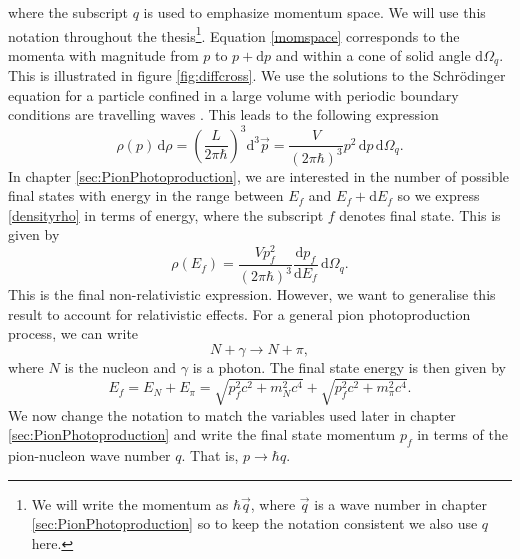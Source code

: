 where the subscript $q$ is used to emphasize momentum space. We will use this notation throughout the thesis\footnote{We will write the momentum as $\hbar \vec{q}$, where $\vec{q}$ is a wave number in chapter \ref{sec:PionPhotoproduction} so to keep the notation consistent we also use $q$ here. }. Equation \eqref{momspace} corresponds to the momenta with magnitude from $p$ to $p+\text{d}p$ and within a cone of solid angle $\text{d}\Omega_q$. This is illustrated in figure \ref{fig:diffcross}. We use the solutions to the Schrödinger equation for a particle confined in a large volume with periodic boundary conditions are travelling waves \cite{Kernebog}. This leads to the following expression
\begin{equation} \label{densityrho}
	\rho(p) \, \text{d}\rho = \left( \frac{L}{2\pi\hbar}\right)^3 \text{d}^3 \vec{p} = \frac{V}{(2\pi\hbar)^3} p^2 \, \text{d}p \, \text{d}\Omega_q.
\end{equation}
In chapter \ref{sec:PionPhotoproduction}, we are interested in the number of possible final states with energy in the range between $E_f$ and $E_f + \text{d}E_f$ so we express \eqref{densityrho} in terms of energy, where the subscript $f$ denotes final state. This is given by \cite{Kernebog}
\begin{equation} \label{densityenergy}
	\rho(E_f) = \frac{V p_f^2}{(2\pi \hbar)^3} \frac{\text{d}p_f}{\text{d}E_f} \, \text{d}\Omega_q.
\end{equation}
This is the final non-relativistic expression. However, we want to generalise this result to account for relativistic effects. For a general pion photoproduction process, we can write
\begin{equation} \label{twobody}
	N + \gamma \rightarrow N+\pi,
\end{equation}
where $N$ is the nucleon and $\gamma$ is a photon. The final state energy \cite{Kernebog} is then given by
\begin{equation} \label{Ef}
	E_f = E_N + E_\pi = \sqrt{p_f^2 c^2 +m_N^2c^4} + \sqrt{p_f^2c^2 + m^2_\pi c^4}.
\end{equation}
We now change the notation to match the variables used later in chapter \ref{sec:PionPhotoproduction} and write the final state momentum $p_f$ in terms of the pion-nucleon wave number $q$. That is, $p\rightarrow \hbar q$. 

